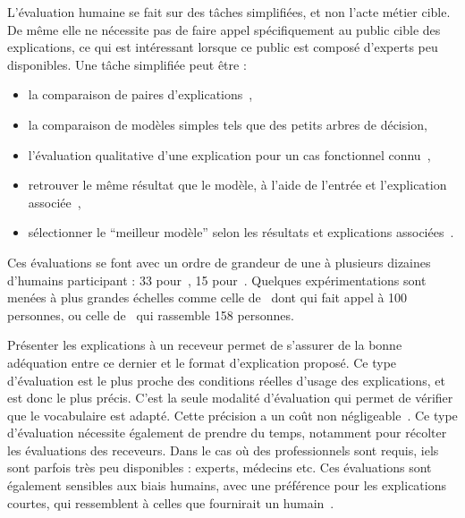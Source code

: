 L'évaluation humaine se fait sur des tâches simplifiées, et non l'acte métier cible. De même elle ne nécessite pas de faire appel spécifiquement au public cible des explications, ce qui est intéressant lorsque ce public est composé d'experts peu disponibles. Une tâche simplifiée peut être :
\begin{itemize}
    \item la comparaison de paires d'explications~\cite{Lakkaraju2019,Dam2018},
    \item la comparaison de modèles simples tels que des petits arbres de décision\cite{Allahyari2011},
    \item l'évaluation qualitative d'une explication pour un cas fonctionnel connu~\cite{Kaadoud2022},
    \item retrouver le même résultat que le modèle, à l'aide de l'entrée et l'explication associée~\cite{Ribeiro2018, Dam2018, Zafar2021a,Lim2009},
    \item sélectionner le ``meilleur modèle'' selon les résultats et explications associées~\cite{Ribeiro2016}.
\end{itemize}
Ces évaluations se font avec un ordre de grandeur de une à plusieurs dizaines d'humains participant : 33 pour~\cite{Lakkaraju2019}, 15 pour~\cite{Zafar2021a}. Quelques expérimentations sont menées à plus grandes échelles comme celle de~\cite{Allahyari2011} dont qui fait appel à 100 personnes, ou celle de~\cite{Lim2009} qui rassemble 158 personnes.

Présenter les explications à un receveur permet de s'assurer de la bonne adéquation entre ce dernier et le format d'explication proposé. Ce type d'évaluation est le plus proche des conditions réelles d'usage des explications, et est donc le plus précis. C'est la seule modalité d'évaluation qui permet de vérifier que le vocabulaire est adapté.
Cette précision a un coût non négligeable~\cite{Dam2018, DoshiVelez2017}. Ce type d'évaluation nécessite également de prendre du temps, notamment pour récolter les évaluations des receveurs. Dans le cas où des professionnels sont requis, iels sont parfois très peu disponibles : experts, médecins etc. Ces évaluations sont également sensibles aux biais humains, avec une préférence pour les explications courtes, qui ressemblent à celles que fournirait un humain~\cite{Petsiuk2018,Miller2019,Gilpin2018}.


